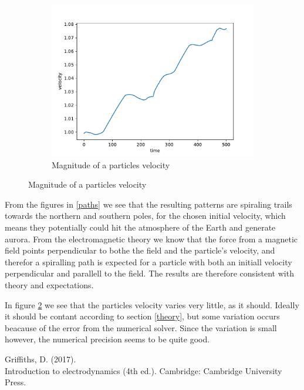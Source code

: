 \documentclass{article}
\begin{document}
\begin{figure}[h]
\begin{subfigure}{0.33\textwidth}
        \includegraphics[width=\linewidth]{./media/velocity.pdf}
        \caption{Magnitude of a particles velocity}
        \label{velocity}
    \end{subfigure}
\end{figure}

\begin{figure}

\end{figure}

\noindent
From the figures in \ref{paths} we see that the resulting patterns are spiraling trails towards the northern and southern poles, for the chosen initial velocity, which means they potentially could hit the atmosphere of the Earth and generate aurora. From the electromagnetic theory we know that the force from a magnetic field points perpendicular to bothe the field and the particle's velocity, and therefor a spiralling path is expected for a particle with both an initiall velocity
perpendicular and parallell to the field. The results are therefore consistent with theory and expectations.

In figure \ref{velocity} we see that the particles velocity varies very little, as it should. Ideally it should be contant according to section \ref{theory}, but some variation occurs beacause of the error from the numerical solver. Since the variation is small however, the numerical precision seems to be quite good.


\begin{thebibliography}{99}
    Griffiths, D. (2017).\\
    Introduction to electrodynamics (4th ed.). Cambridge: Cambridge University Press.
\end{thebibliography}
\end{document}
